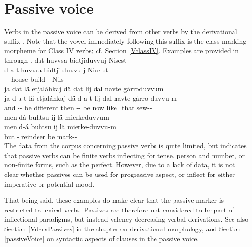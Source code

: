 \section{Passive voice}\label{passiveVinflection}
Verbs in the passive voice can be derived from other verbs by the derivational suffix . Note that the vowel immediately following this suffix is the class marking morpheme for Class IV verbs; cf. Section \ref{VclassIV}. 
Examples are provided in  through . 
\ea\label{passEx4}%
\glll	dat huvvsa bidtjiduvvuj Nisest\\
	d-a-t huvvsa bidtji-duvvu-j Nise-st\\
	-- house\BS{} build-- Nils-\\\nopagebreak
{}	
\z
\ea\label{passEx1a}%
\glll	ja dat lä etjaláhkaj dä dat lij dal navte gårroduvvum\\
	ja d-a-t lä etjaláhkaj dä d-a-t lij dal navte gårro-duvvu-m\\
	and -- be\BS{} different then -- be\BS{} now like\_that sew--\\\nopagebreak
{}	
\z
\ea\label{passEx1b}%
\glll	men dá buhtsu ij lä mierkeduvvum\\
	men d-á buhtsu ij lä mierke-duvvu-m\\
	but -\BS{} reindeer\BS{} \BS{} be\BS{} mark--\\\nopagebreak
{}	
\z
The data from the corpus concerning passive verbs is quite limited, but indicates that passive verbs can be finite verbs inflecting for tense, person and number, or non-finite forms, such as the perfect. However, due to a lack of data, it is not clear whether passives can be used for progressive aspect, or inflect for either imperative or potential mood. 

That being said, these examples do make clear that the passive marker is restricted to lexical verbs. %
Passives are therefore not considered to be part of inflectional paradigms, but instead valency-decreasing verbal derivations. See also Section \ref{VdervPassives} in the chapter on derivational morphology, and Section \ref{passiveVoice} on syntactic aspects of clauses in the passive voice. 

